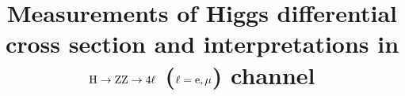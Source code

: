 \newcommand{\Zee}{\mathrm{\cPZ\rightarrow\Pe^{+}\Pe^{-}}}
\newcommand{\Zone}{\mathrm{Z}}
\newcommand{\MassD}{\mathrm{{\cal D}_{\rm mass}} }
\newcommand{\MassDprime}{\mathrm{{\cal D}'_{\rm mass}} }
\newcommand{\LikMass}{\mathcal{L}_{3D}^{m,\Gamma} }
\newcommand{\LikMassTwoD}{\mathcal{L}_{2D}^{m,\Gamma} }
\newcommand{\LikMassOneD}{\mathcal{L}_{1D}^{m,\Gamma} }
\newcommand{\LikMuOneD}{\mathrm{{\cal L}_{1D}(m_{4l})} }
\newcommand{\LikMuTwoD}{\mathrm{{\cal L}_{2D}(m_{4l},\KD)} }
\newcommand{\LikMuOneDPrime}{\mathrm{{\cal L}_{1D}(m_{4l}')} }
\newcommand{\LikMuTwoDPrime}{\mathrm{{\cal L}_{2D}(m_{4l}',\KD)} }
\newcommand{\muV}{\ensuremath{\mu_{\mathrm{VBF},\mathrm{V\PH}}} }
\newcommand{\muF}{\ensuremath{\mu_{\Pg\Pg\PH,\,\ttbar\PH}} }
\providecommand{\cmsTable}[1]{\resizebox{\textwidth}{!}{#1}}

\newcommand{\usedLumiA}{36.8\fbinv}
\newcommand{\usedLumiB}{41.4\fbinv}
\newcommand{\usedLumiC}{58.8\fbinv}
\newcommand{\usedLumiABC}{137\fbinv}
\newcommand{\posOfPValueMinimum}{12X.X}
\newcommand{\expSignAtMinimum}{xx.x}
\newcommand{\obsSignAtMinimum}{yy.y}
\newcommand{\expSignAtRunIMass}{10.5}
\newcommand{\obsSignAtRunIMass}{10.8}
\newcommand{\valMuAtRunIMass}{\ensuremath{1.11^{+0.19}_{-0.17}}}
\newcommand{\valMuVAtRunIMass}{\ensuremath{0.98}^{+0.92}_{-0.68}}
\newcommand{\valMuFAtRunIMass}{\ensuremath{1.17}^{+0.19}_{-0.18}}
\newcommand{\valMass}{\ensuremath{12X.XX^{+0.xx}_{-0.yy}}}
\newcommand{\valMassThreeDRefit}{\ensuremath{125.25 \pm 0.20 (\mathrm{stat.}) \pm 0.08 (\mathrm{sys.})}}
\newcommand{\valMuV}{\ensuremath{0.82}^{+0.36}_{-0.31}}
\newcommand{\valMuF}{\ensuremath{0.96}^{+0.14}_{-0.12}}


\newcommand{\Dbkgkin}{\ensuremath{{\mathcal{D}}^{\mathrm{kin}}_{\mathrm{bkg}}}\xspace}
\newcommand{\DbkgVBFdec}{\ensuremath{{\mathcal{D}}^{\mathrm{VBF}+\mathrm{dec}}_{\mathrm{bkg}}}\xspace}
\newcommand{\DbkgVHdec}{\ensuremath{{\mathcal{D}}^{\mathrm{VH}+\mathrm{dec}}_{\mathrm{bkg}}}\xspace}


\title{Measurements of Higgs differential cross section and interpretations in $\mathrm{H}\rightarrow{\rm Z}{\rm Z}\rightarrow4\ell$ ($\ell={\rm e},\mu$) channel}


